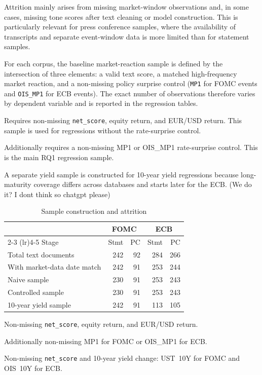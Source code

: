Attrition mainly arises from missing market-window observations and, in
some cases, missing tone scores after text cleaning or model construction.
This is particularly relevant for press conference samples, where the
availability of transcripts and separate event-window data is more limited
than for statement samples.

For each corpus, the baseline market-reaction sample is defined by the
intersection of three elements: a valid text score, a matched
high-frequency market reaction, and a non-missing policy surprise control
(\texttt{MP1} for FOMC events and \texttt{OIS\_MP1} for ECB events).
The exact number of observations therefore varies by dependent variable
and is reported in the regression tables.

\begin{description}[noitemsep]
  \item[Naive sample:] Requires non-missing \texttt{net\_score}, equity return, and
  EUR/USD return. This sample is used for regressions without the rate-surprise control.
  \item[Controlled sample:] Additionally requires a non-missing MP1 or OIS\_MP1
  rate-surprise control. This is the main RQ1 regression sample.
\end{description}

A separate yield sample is constructed for 10-year yield regressions because long-maturity
coverage differs across databases and starts later for the ECB. (We do it? I dont think so chatgpt please)

\begin{table}[htbp]
\centering
\caption{Sample construction and attrition}
\label{tab:sample_attrition}
\begin{threeparttable}
\begin{tabular}{lrrrr}
\toprule
& \multicolumn{2}{c}{FOMC} & \multicolumn{2}{c}{ECB} \\
\cmidrule(lr){2-3} \cmidrule(lr){4-5}
Stage & Stmt & PC & Stmt & PC \\
\midrule
Total text documents             & 242 & 92 & 284 & 266 \\
With market-data date match       & 242 & 91 & 253 & 244 \\
Naive sample\tnote{a}             & 230 & 91 & 253 & 243 \\
Controlled sample\tnote{b}        & 230 & 91 & 253 & 243 \\
10-year yield sample\tnote{c}     & 242 & 91 & 113 & 105 \\
\bottomrule
\end{tabular}
\begin{tablenotes}\footnotesize
  \item[a] Non-missing \texttt{net\_score}, equity return, and EUR/USD return.
  \item[b] Additionally non-missing MP1 for FOMC or OIS\_MP1 for ECB.
  \item[c] Non-missing \texttt{net\_score} and 10-year yield change: UST~10Y for
  FOMC and OIS~10Y for ECB.
\end{tablenotes}
\end{threeparttable}
\end{table}

